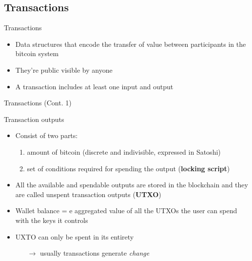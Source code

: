 \documentclass{beamer}
\begin{document}
  \subsection{Transactions}
  \begin{frame}{Transactions}
    \begin{itemize}
      \item Data structures that encode the transfer of value between participants
      in the bitcoin system 
      \item They're public visible by anyone 
      \item A transaction includes at least one input and output
    \end{itemize}
  \end{frame}





  \begin{frame}{Transactions (Cont. 1)}
    \begin{block}{Transaction outputs}
      \begin{itemize}
        \item Consist of two parts:
        \begin{enumerate}
          \item amount of bitcoin (discrete and indivisible, expressed in Satoshi)
          \item set of conditions required for spending the output (\textbf{locking script})
        \end{enumerate}
        \pause
        \item All the available and spendable outputs are stored in the blockchain
        and they are called unspent transaction outputs (\textbf{UTXO}) 
        \item Wallet balance = e aggregated value of all the UTXOs the user can spend with the keys it controls 
        \item UXTO can only be spent in its entirety 
        \begin{itemize}
          \item[$\rightarrow$] usually transactions generate \emph{change}
        \end{itemize}
      \end{itemize}
    \end{block}
  \end{frame}
\end{document}
